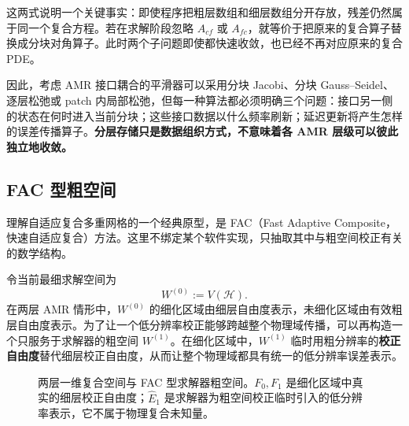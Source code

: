 这两式说明一个关键事实：即使程序把粗层数组和细层数组分开存放，残差仍然属于同一个复合方程。若在求解阶段忽略 $A_{cf}$ 或 $A_{fc}$，就等价于把原来的复合算子替换成分块对角算子。此时两个子问题即使都快速收敛，也已经不再对应原来的复合 PDE。

因此，考虑 AMR 接口耦合的平滑器可以采用分块 Jacobi、分块 Gauss--Seidel、逐层松弛或 patch 内局部松弛，但每一种算法都必须明确三个问题：接口另一侧的状态在何时进入当前分块；这些接口数据以什么频率刷新；延迟更新将产生怎样的误差传播算子。\textbf{分层存储只是数据组织方式，不意味着各 AMR 层级可以彼此独立地收敛。}

\subsection{FAC 型粗空间}
\label{sec:fac-coarse-space}

理解自适应复合多重网格的一个经典原型，是 FAC（Fast Adaptive Composite，快速自适应复合）方法。这里不绑定某个软件实现，只抽取其中与粗空间校正有关的数学结构。

令当前最细求解空间为
\begin{equation}
W^{(0)}:=V(\mathcal H).
\end{equation}
在两层 AMR 情形中，$W^{(0)}$ 的细化区域由细层自由度表示，未细化区域由有效粗层自由度表示。为了让一个低分辨率校正能够跨越整个物理域传播，可以再构造一个只服务于求解器的粗空间 $W^{(1)}$。在细化区域中，$W^{(1)}$ 临时用粗分辨率的\textbf{校正自由度}替代细层校正自由度，从而让整个物理域都具有统一的低分辨率误差表示。

\begin{figure}[htbp]
\centering
{}
\caption{两层一维复合空间与 FAC 型求解器粗空间。$F_0,F_1$ 是细化区域中真实的细层校正自由度；$\widehat E_1$ 是求解器为粗空间校正临时引入的低分辨率表示，它不属于物理复合未知量。}
\label{fig:fac-two-level-space}
\end{figure}

